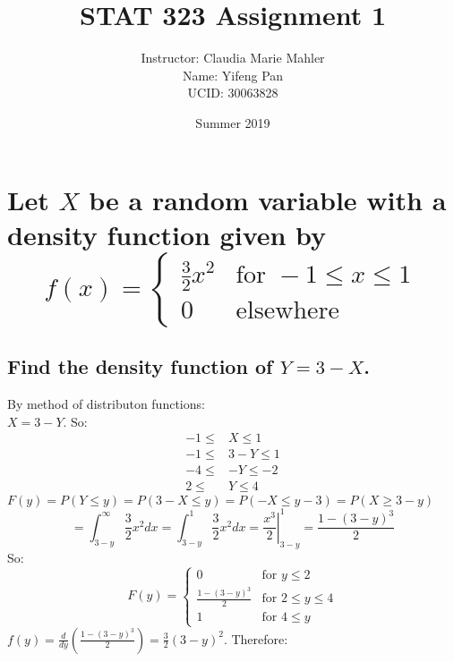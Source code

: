 \documentclass[10pt, letterpaper, titlepage]{article}
\title{STAT 323 Assignment 1}
\author{Instructor: Claudia Marie Mahler
    \\Name: Yifeng Pan
    \\UCID: 30063828}
\date{Summer 2019}
\newcommand*\eval[3]{\left.#1\right\rvert_{#2}^{#3}}
\begin{document}
    \maketitle
    \section[]{
        Let $X$ be a random variable with a density function given by
        \[
            f(x) = 
            \begin{cases} 
                \frac{3}{2}x^2 & \text{for } -1 \leq x \leq 1 \\
                0              & \text{elsewhere}
            \end{cases}
        \]
    }
        \subsection{Find the density function of $Y = 3 - X$.}
            By method of distributon functions:\\
            $X = 3 - Y$. So: 
            \begin{align*}
                -1 \leq &X \leq 1 \\
                -1 \leq &3-Y \leq 1 \\
                -4 \leq &-Y \leq -2 \\
                 2 \leq &Y \leq 4 
            \end{align*}
            $F(y) = P(Y \leq y) = P(3-X \leq y) = P(-X \leq y - 3) = P(X \geq 3 - y)$
            \[
                = \int_{3-y}^\infty{\frac{3}{2}x^2} dx
                = \int_{3-y}^1{\frac{3}{2}x^2} dx
                = \eval{\frac{x^3}{2}}{3-y}{1}
                = \frac{1 - (3-y)^3}{2}
            \]
            So:
            \[
                F(y) =
                \begin{cases}
                    0                     & \text{for } y \leq 2\\
                    \frac{1 - (3-y)^3}{2} & \text{for } 2 \leq y \leq 4\\
                    1                     & \text{for } 4 \leq y
                \end{cases}
            \]
            $f(y) = \frac{d}{dy}(\frac{1 - (3-y)^3}{2}) = \frac{3}{2} (3-y)^2$.
            Therefore:
        
\end{document}
